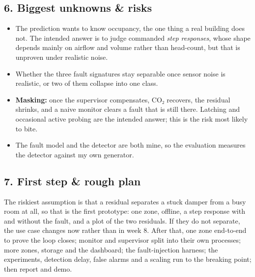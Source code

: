 \documentclass[
  11pt,
]{article}
\providecommand{\tightlist}{%
  \setlength{\itemsep}{0pt}\setlength{\parskip}{0pt}}
\begin{document}
\hypertarget{biggest-unknowns-risks}{%
\subsection{6. Biggest unknowns \& risks}\label{biggest-unknowns-risks}}

\begin{itemize}
\tightlist
\item
  The prediction wants to know occupancy, the one thing a real building
  does not. The intended answer is to judge commanded \emph{step
  responses}, whose shape depends mainly on airflow and volume rather
  than head-count, but that is unproven under realistic noise.
\item
  Whether the three fault signatures stay separable once sensor noise is
  realistic, or two of them collapse into one class.
\item
  \textbf{Masking:} once the supervisor compensates, CO₂ recovers, the
  residual shrinks, and a naive monitor clears a fault that is still
  there. Latching and occasional active probing are the intended answer;
  this is the risk most likely to bite.
\item
  The fault model and the detector are both mine, so the evaluation
  measures the detector against my own generator.
\end{itemize}

\hypertarget{first-step-rough-plan}{%
\subsection{7. First step \& rough plan}\label{first-step-rough-plan}}

The riskiest assumption is that a residual separates a stuck damper from
a busy room at all, so that is the first prototype: one zone, offline, a
step response with and without the fault, and a plot of the two
residuals. If they do not separate, the use case changes now rather than
in week 8. After that, one zone end-to-end to prove the loop closes;
monitor and supervisor split into their own processes; more zones,
storage and the dashboard; the fault-injection harness; the experiments,
detection delay, false alarms and a scaling run to the breaking point;
then report and demo.
\end{document}
